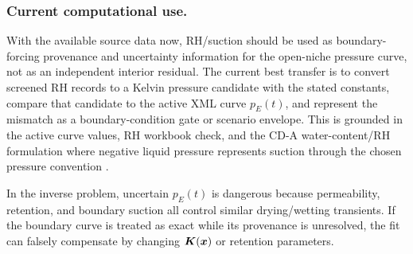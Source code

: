\subsubsection*{Current computational use.}
With the available source data now, RH/suction should be used as boundary-forcing
provenance and uncertainty information for the open-niche pressure curve, not as an
independent interior residual.  The current best transfer is to convert screened RH
records to a Kelvin pressure candidate with the stated constants, compare that
candidate to the active XML curve \(p_E(t)\), and represent the mismatch as a
boundary-condition gate or scenario envelope.  This is grounded in the active curve
values, RH workbook check, and the CD-A water-content/RH formulation where negative
liquid pressure represents suction through the chosen pressure convention
\citep[pp.~448--452]{Thomson1871Kelvin}
\citep[Sec.~3, Eqs.~1--2]{WaterContentEDZ2024}
\citep[RH source workbooks used for the generated boundary checks]{CDAProvidedMeasurementFiles2025}.

In the inverse problem, uncertain \(p_E(t)\) is dangerous because permeability,
retention, and boundary suction all control similar drying/wetting transients.
If the boundary curve is treated as exact while its provenance is unresolved, the
fit can falsely compensate by changing \(\bm{K}(\bm{x})\) or retention parameters.

